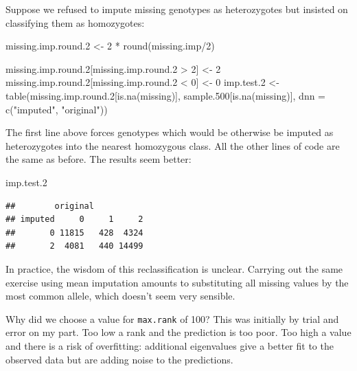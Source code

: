 \documentclass[
]{book}
\newenvironment{Shaded}{\begin{snugshade}}{\end{snugshade}}
\newcommand{\AttributeTok}[1]{\textcolor[rgb]{0.77,0.63,0.00}{#1}}
\newcommand{\DecValTok}[1]{\textcolor[rgb]{0.00,0.00,0.81}{#1}}
\newcommand{\FloatTok}[1]{\textcolor[rgb]{0.00,0.00,0.81}{#1}}
\newcommand{\FunctionTok}[1]{\textcolor[rgb]{0.00,0.00,0.00}{#1}}
\newcommand{\NormalTok}[1]{#1}
\newcommand{\OtherTok}[1]{\textcolor[rgb]{0.56,0.35,0.01}{#1}}
\newcommand{\SpecialCharTok}[1]{\textcolor[rgb]{0.00,0.00,0.00}{#1}}
\newcommand{\StringTok}[1]{\textcolor[rgb]{0.31,0.60,0.02}{#1}}
\begin{document}
Suppose we refused to impute missing genotypes as heterozygotes but insisted on classifying them as homozygotes:

\begin{Shaded}
\begin{Highlighting}[]
\NormalTok{missing.imp.round}\FloatTok{.2} \OtherTok{\textless{}{-}} \DecValTok{2} \SpecialCharTok{*} \FunctionTok{round}\NormalTok{(missing.imp}\SpecialCharTok{/}\DecValTok{2}\NormalTok{)}

\NormalTok{missing.imp.round}\FloatTok{.2}\NormalTok{[missing.imp.round}\FloatTok{.2} \SpecialCharTok{\textgreater{}} \DecValTok{2}\NormalTok{] }\OtherTok{\textless{}{-}} \DecValTok{2}
\NormalTok{missing.imp.round}\FloatTok{.2}\NormalTok{[missing.imp.round}\FloatTok{.2} \SpecialCharTok{\textless{}} \DecValTok{0}\NormalTok{] }\OtherTok{\textless{}{-}} \DecValTok{0}
\NormalTok{imp.test}\FloatTok{.2} \OtherTok{\textless{}{-}} \FunctionTok{table}\NormalTok{(missing.imp.round}\FloatTok{.2}\NormalTok{[}\FunctionTok{is.na}\NormalTok{(missing)], sample}\FloatTok{.500}\NormalTok{[}\FunctionTok{is.na}\NormalTok{(missing)], }
    \AttributeTok{dnn =} \FunctionTok{c}\NormalTok{(}\StringTok{"imputed"}\NormalTok{, }\StringTok{"original"}\NormalTok{))}
\end{Highlighting}
\end{Shaded}

The first line above forces genotypes which would be otherwise be imputed as heterozygotes into the nearest homozygous class. All the other lines of code are the same as before. The results seem better:

\begin{Shaded}
\begin{Highlighting}[]
\NormalTok{imp.test}\FloatTok{.2}
\end{Highlighting}
\end{Shaded}

\begin{verbatim}
##        original
## imputed     0     1     2
##       0 11815   428  4324
##       2  4081   440 14499
\end{verbatim}

In practice, the wisdom of this reclassification is unclear. Carrying out the same exercise using mean imputation amounts to substituting all missing values by the most common allele, which doesn't seem very sensible.

Why did we choose a value for \texttt{max.rank} of 100? This was initially by trial and error on my part. Too low a rank and the prediction is too poor. Too high a value and there is a risk of overfitting: additional eigenvalues give a better fit to the observed data but are adding noise to the predictions.
\end{document}
